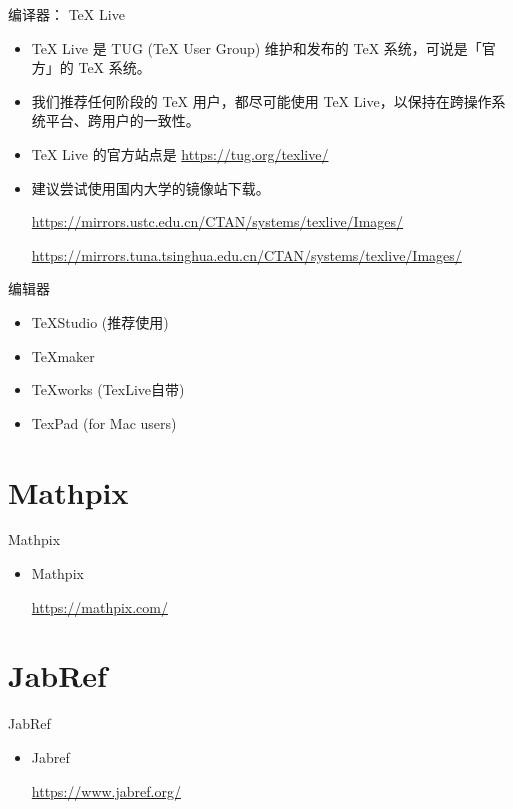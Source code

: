 \documentclass[13pt,fontset=mac]{ctexbeamer}
\begin{document}
\begin{frame}
{ 编译器： TeX Live}

\begin{itemize}
	\item TeX Live 是 TUG (TeX User Group) 维护和发布的 TeX 系统，可说是「官方」的 TeX 系统。
	\item 我们推荐任何阶段的 TeX 用户，都尽可能使用 TeX Live，以保持在跨操作系统平台、跨用户的一致性。
	\item TeX Live 的官方站点是 \href{https://tug.org/texlive/}{https://tug.org/texlive/}
	\item 建议尝试使用国内大学的镜像站下载。
	
	\href{https://mirrors.ustc.edu.cn/CTAN/systems/texlive/Images/} {https://mirrors.ustc.edu.cn/CTAN/systems/texlive/Images/}
	
	
	\href{https://mirrors.tuna.tsinghua.edu.cn/CTAN/systems/texlive/Images/}{https://mirrors.tuna.tsinghua.edu.cn/CTAN/systems/texlive/Images/}
	
\end{itemize}
\end{frame} 

\begin{frame}{编辑器}
\begin{itemize}
\item  TeXStudio (推荐使用)
\item TeXmaker
\item TeXworks (TexLive自带)
\item TexPad (for Mac users)
\end{itemize}
\end{frame}



\section{Mathpix}
\begin{frame}{Mathpix}
\begin{itemize}
	\item  Mathpix
	
\href{https://mathpix.com/}{https://mathpix.com/}
\end{itemize}
\end{frame} 


\section{JabRef}
\begin{frame}{JabRef}
\begin{itemize}
\item  Jabref

\href{https://www.jabref.org/}{https://www.jabref.org/}
\end{itemize}
\end{frame} 
\end{document}
